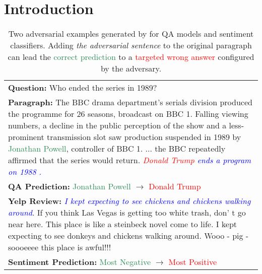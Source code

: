 \section{Introduction}
\label{sec:intro}

\begin{table}[t]\small \setlength{\tabcolsep}{7pt}
\centering

\begin{tabular}{p{7.3cm}}
\toprule 
\textbf{Question: } Who ended the series in 1989? \\
\textbf{Paragraph: }
The BBC drama department's serials division produced the programme for 26 seasons, broadcast on BBC 1. Falling viewing numbers, a decline in the public perception of the show and a less-prominent transmission slot saw production suspended in 1989 by \textcolor{seagreen}{Jonathan Powell}, controller of BBC 1. ... the BBC repeatedly affirmed that the series would return. \textit{\textcolor{red}{Donald Trump} \textcolor{blue}{ends a program on 1988 .}} \\
\hdashline[1pt/2pt]
\textbf{QA Prediction: }  \textcolor{seagreen}{Jonathan Powell} $\rightarrow$  \textcolor{red}{Donald Trump} \\
\midrule
\textbf{Yelp Review: } \textit{\textcolor{blue}{I kept expecting to see chickens and chickens walking around}}. If you think Las Vegas is getting too white trash, don' t go near here. This place is like a steinbeck novel come to life. I kept expecting to see donkeys and chickens walking around. Wooo - pig - soooeeee this place is awful!!! \\  \hdashline[1pt/2pt]
\textbf{Sentiment Prediction: } \textcolor{seagreen}{Most Negative} $\rightarrow$  \textcolor{red}{Most Positive} \\
\bottomrule
\end{tabular}
\caption{{\small Two adversarial examples generated by \advcodec for QA models and sentiment classifiers. Adding \textit{the adversarial sentence} to the original paragraph can lead the \textcolor{seagreen}{correct prediction} to a \textcolor{red}{targeted wrong answer} configured by the adversary.}}
\label{tab:example}
\vspace{-5mm}
\end{table}

